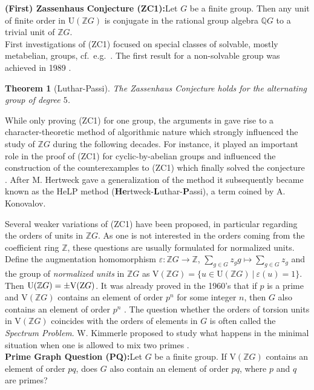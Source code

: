 \documentclass[10pt,a4paper,reqno]{amsart}
\newtheorem{theorem}{Theorem}[section]
\theoremstyle{definition}
\theoremstyle{remark}
\newcommand{\Z}{\textup{Z}}
\newcommand{\U}{\mathrm{U}}
\newcommand{\V}{\mathrm{V}}
\newcommand{\ZZ}{\mathbb{Z}}
\newcommand{\QQ}{\mathbb{Q}}
\begin{document}
\noindent\textbf{(First) Zassenhaus Conjecture (ZC1):}\quad Let $G$ be a finite group. Then any unit of finite order in $\U(\ZZ G)$ is conjugate in the rational group algebra $\QQ G$ to a trivial unit of $\ZZ G$.\\

First investigations of (ZC1) focused on special classes of solvable, mostly metabelian, groups, cf.\ e.g.\ \cite{HP72, AH80, LB83, MRSW87}. The first result for a non-solvable group was achieved in 1989 \cite{LP89}.

\begin{theorem}[Luthar-Passi]\label{th:A5}
The Zassenhaus Conjecture holds for the alternating group of degree $5$.
\end{theorem}

While only proving (ZC1) for one group, the arguments in \cite{LP89} gave rise to a character-theoretic method of algorithmic nature which strongly influenced the study of $\ZZ G$ during the following decades. For instance, it played an important role in the proof of (ZC1) for cyclic-by-abelian groups \cite{Her08, CMdR13} and influenced the construction of the counterexamples to (ZC1) which finally solved the conjecture \cite{EM18}. After M. Hertweck gave a generalization of the method \cite{HertweckBrauer} it subsequently became known as the HeLP method (\textbf{He}rtweck-\textbf{L}uthar-\textbf{P}assi), a term coined by A. Konovalov. 

Several weaker variations of (ZC1) have been proposed, in particular regarding the orders of units in $\ZZ G$. As one is not interested in the orders coming from the coefficient ring $\ZZ$, these questions are usually formulated for normalized units. Define the augmentation homomorphism $\varepsilon: \ZZ G \rightarrow \ZZ$, $\sum_{g \in G} z_g g \mapsto \sum_{g \in G} z_g$ and the group of \emph{normalized units} in $\ZZ G$ as $\V(\ZZ G) = \{u \in \U(\ZZ G) \ | \ \varepsilon(u) =1 \}$. Then $\U(\ZZ G) = \pm \V(\Z G)$. It was already proved in the 1960's that if $p$ is a prime and $\V(\ZZ G)$ contains an element of order $p^n$ for some integer $n$, then $G$ also contains an element of order $p^n$ \cite{CL65}. The question whether the orders of torsion units in $\V(\ZZ G)$ coincides with the orders of elements in $G$ is often called the \emph{Spectrum Problem}. W. Kimmerle proposed to study what happens in the minimal situation when one is allowed to mix two primes \cite{Kim06}.\\

\noindent\textbf{Prime Graph Question (PQ):}\quad Let $G$ be a finite group. If $\V(\ZZ G)$ contains an element of order $pq$, does $G$ also contain an element of order $pq$, where $p$ and $q$ are primes? \\
\end{document}
